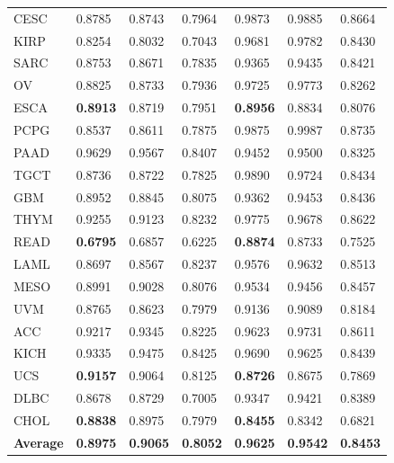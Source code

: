 \begin{table}[h]
\begin{center}
{\begin{tabular}{l|lll|lll}
        CESC   & 0.8785 & 0.8743 & 0.7964 & 0.9873 & 0.9885 & 0.8664  \\%
        KIRP   & 0.8254 & 0.8032 & 0.7043 & 0.9681 & 0.9782 & 0.8430  \\%
        SARC   & 0.8753 & 0.8671 & 0.7835 & 0.9365 & 0.9435 & 0.8421 \\%
        OV     & 0.8825 & 0.8733 & 0.7936 & 0.9725 & 0.9773 & 0.8262  \\%
        ESCA   & {\color{cyan}\textbf{0.8913}} & 0.8719 & 0.7951 &  {\color{cyan}\textbf{0.8956}} & 0.8834 & 0.8076  \\%
        PCPG   & 0.8537 & 0.8611 & 0.7875 & 0.9875 & 0.9987 & 0.8735  \\%
        PAAD   & 0.9629 & 0.9567 & 0.8407 & 0.9452 & 0.9500 & 0.8325  \\%
        TGCT   & 0.8736 & 0.8722 & 0.7825 & 0.9890 & 0.9724 & 0.8434  \\%
        GBM    & 0.8952 & 0.8845 & 0.8075 & 0.9362 & 0.9453 & 0.8436  \\%
        THYM   & 0.9255 & 0.9123 & 0.8232 & 0.9775 & 0.9678 & 0.8622  \\%
        READ   & {\color{cyan}\textbf{0.6795}} & 0.6857 & 0.6225 & {\color{cyan}\textbf{0.8874}} & 0.8733 & 0.7525  \\%
        LAML   & 0.8697 & 0.8567 & 0.8237 & 0.9576 & 0.9632 & 0.8513  \\%
        MESO   & 0.8991 & 0.9028 & 0.8076 & 0.9534 & 0.9456 & 0.8457  \\%
        UVM    & 0.8765 & 0.8623 & 0.7979 & 0.9136 & 0.9089 & 0.8184  \\%
        ACC    & 0.9217 & 0.9345 & 0.8225 & 0.9623 & 0.9731 & 0.8611  \\%
        KICH   & 0.9335 & 0.9475 & 0.8425 & 0.9690 & 0.9625 & 0.8439  \\%
        UCS    & {\color{cyan}\textbf{0.9157}} & 0.9064 & 0.8125 & {\color{cyan}\textbf{0.8726}} & 0.8675 & 0.7869  \\%
        DLBC   & 0.8678 & 0.8729 & 0.7005 & 0.9347 & 0.9421 & 0.8389  \\%
        CHOL   & {\color{cyan}\textbf{0.8838}} & 0.8975 & 0.7979 & {\color{cyan}\textbf{0.8455}} & 0.8342 & 0.6821  \\%
        \midrule
        \textbf{Average} &   \textbf{0.8975}    &  \textbf{0.9065} &    \textbf{0.8052}   &  \textbf{0.9625} & \textbf{0.9542} & \textbf{0.8453}\\
        \bottomrule
        \end{tabular}}
        \vspace{-4mm}
    \end{center}
\end{table}

